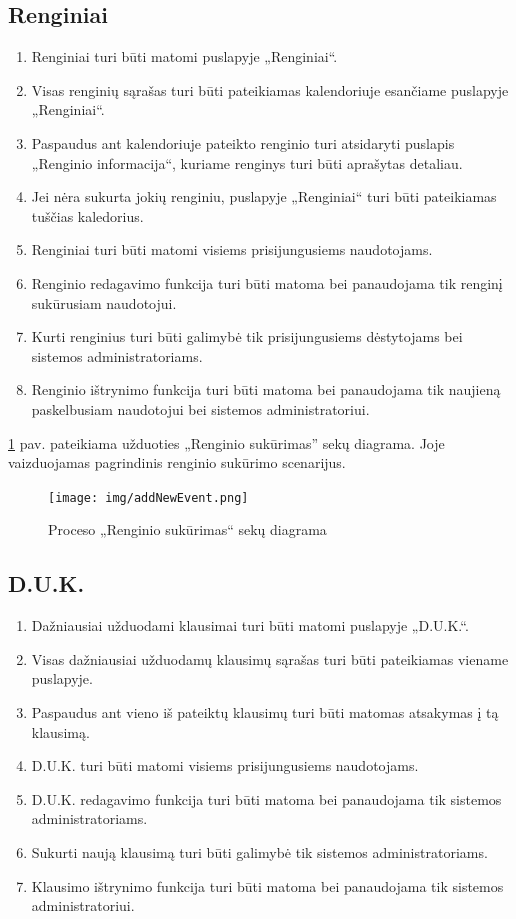 \documentclass{VUMIFPSkursinis}
\begin{document}
\subsection{Renginiai}
\begin{enumerate}[label=FR6.\arabic*] 
	\item Renginiai turi būti matomi puslapyje „Renginiai“.
	\item Visas renginių sąrašas turi būti pateikiamas kalendoriuje esančiame puslapyje „Renginiai“.
	\item Paspaudus ant kalendoriuje pateikto renginio turi atsidaryti puslapis „Renginio informacija“, kuriame renginys turi būti aprašytas detaliau.
	\item Jei nėra sukurta jokių renginiu, puslapyje „Renginiai“ turi būti pateikiamas tuščias kaledorius.
	\item Renginiai turi būti matomi visiems prisijungusiems naudotojams.
	\item Renginio redagavimo funkcija turi būti matoma bei panaudojama tik renginį sukūrusiam naudotojui.
	\item Kurti renginius turi būti galimybė tik prisijungusiems dėstytojams bei sistemos administratoriams.
	\item Renginio ištrynimo funkcija turi būti matoma bei panaudojama tik naujieną paskelbusiam naudotojui bei sistemos administratoriui.\newline
\end{enumerate}

\ref{fig:addevent} pav. pateikiama užduoties „Renginio sukūrimas” sekų diagrama. Joje vaizduojamas pagrindinis
renginio sukūrimo scenarijus.
\begin{figure}[H]
	\centering
	\texttt{[image: img/addNewEvent.png]}
	\caption{Proceso „Renginio sukūrimas“ sekų diagrama}
	\label{fig:addevent}
\end{figure}

\subsection{D.U.K.}
\begin{enumerate}[label=FR7.\arabic*] 
	\item Dažniausiai užduodami klausimai turi būti matomi puslapyje „D.U.K.“.
	\item Visas dažniausiai užduodamų klausimų sąrašas turi būti pateikiamas viename puslapyje.
	\item Paspaudus ant vieno iš pateiktų klausimų turi būti matomas atsakymas į tą klausimą.
	\item D.U.K. turi būti matomi visiems prisijungusiems naudotojams.
	\item D.U.K. redagavimo funkcija turi būti matoma bei panaudojama tik sistemos administratoriams.
	\item Sukurti naują klausimą turi būti galimybė tik sistemos administratoriams.
	\item Klausimo ištrynimo funkcija turi būti matoma bei panaudojama tik sistemos administratoriui.\newline
\end{enumerate}
\end{document}

